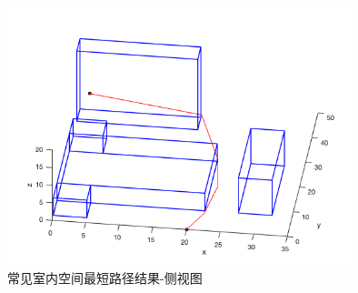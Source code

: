\begin{figure}[htb]
    \centering
    \caption{常见室内空间最短路径结果-侧视图}
    \label{fig:test_common_situation_out_lean}
    \includegraphics[width=10cm]{figures/test_common_situation_out_lean.png}
\end{figure}

